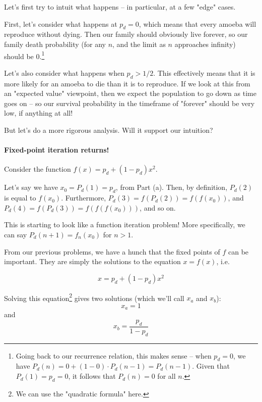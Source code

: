 Let's first try to intuit what happens -- in particular, at a few "edge" cases.

First, let's consider what happens at $p_d = 0$, which means that every amoeba will reproduce without dying. Then our family should obviously live forever, so our family death probability (for any $n$, and the limit as $n$ approaches infinity) should be 0.\footnote{Going back to our recurrence relation, this makes sense -- when $p_d = 0$, we have $P_d(n) = 0 + (1 - 0) \cdot P_d(n-1) = P_d(n-1)$. Given that $P_d(1) = p_d = 0$, it follows that $P_d(n) = 0$ for all $n$.}

Let's also consider what happens when $p_d > 1/2$. This effectively means that it is more likely for an amoeba to die than it is to reproduce. If we look at this from an "expected value" viewpoint, then we expect the population to go down as time goes on -- so our survival probability in the timeframe of "forever" should be very low, if anything at all!

But let's do a more rigorous analysis. Will it support our intuition?


\paragraph{Fixed-point iteration returns!}

Consider the function $f(x) = p_d + (1 - p_d)x^2$. 

Let's say we have $x_0 = P_d(1) = p_d$, from Part (a). Then, by definition, $P_d(2)$ is equal to $f(x_0)$. Furthermore, $P_d(3) = f(P_d(2)) = f(f(x_0))$, and $P_d(4) = f(P_d(3)) = f(f(f(x_0)))$, and so on.

This is starting to look like a function iteration problem! More specifically, we can say $P_d(n+1) = f_n(x_0)$ for $n > 1$. 

From our previous problems, we have a hunch that the fixed points of $f$ can be important. They are simply the solutions to the equation $x = f(x)$, i.e.

\begin{equation*}
x = p_d + (1 - p_d)x^2
\end{equation*}

Solving this equation\footnote{We can use the "quadratic formula" here.} gives two solutions (which we'll call $x_a$ and $x_b$):
\begin{equation*}
x_a = 1
\end{equation*}
and 
\begin{equation*}
x_b = \frac{p_d}{1 - p_d}
\end{equation*}

